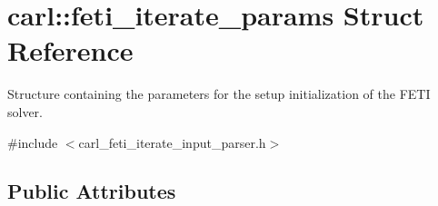 \hypertarget{structcarl_1_1feti__iterate__params}{}\section{carl\+:\+:feti\+\_\+iterate\+\_\+params Struct Reference}
\label{structcarl_1_1feti__iterate__params}


Structure containing the parameters for the setup initialization of the F\+E\+T\+I solver.  




{\ttfamily \#include $<$carl\+\_\+feti\+\_\+iterate\+\_\+input\+\_\+parser.\+h$>$}

\subsection*{Public Attributes}
